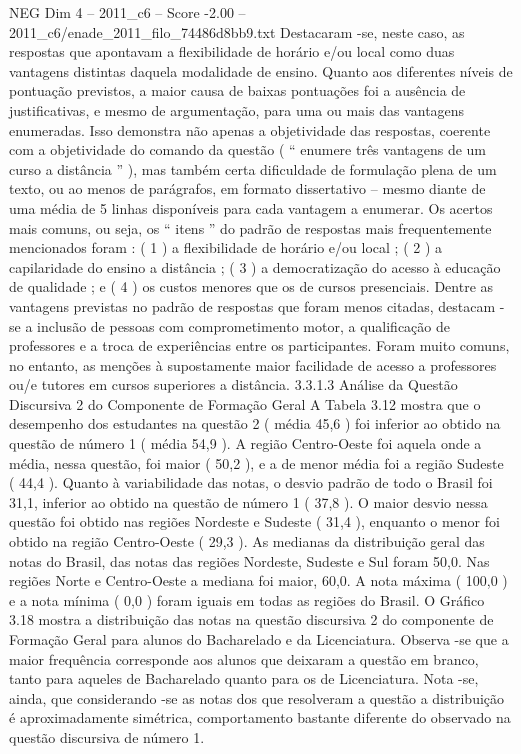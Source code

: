 \begin{textsample}{NEG Dim 4 – 2011\_c6 – Score -2.00 – 2011\_c6/enade\_2011\_filo\_74486d8bb9.txt}
Destacaram -se, neste caso, as respostas que apontavam a flexibilidade de horário e/ou local como duas vantagens distintas daquela modalidade de ensino.
Quanto aos diferentes níveis de pontuação previstos, a maior causa de baixas pontuações foi a ausência de justificativas, e mesmo de argumentação, para uma ou mais das vantagens enumeradas.
Isso demonstra não apenas a objetividade das respostas, coerente com a objetividade do comando da questão ( “ enumere três vantagens de um curso a distância ” ), mas também certa dificuldade de formulação plena de um texto, ou ao menos de parágrafos, em formato dissertativo – mesmo diante de uma média de 5 linhas disponíveis para cada vantagem a enumerar.
Os acertos mais comuns, ou seja, os “ itens ” do padrão de respostas mais frequentemente mencionados foram : ( 1 ) a flexibilidade de horário e/ou local ; ( 2 ) a capilaridade do ensino a distância ; ( 3 ) a democratização do acesso à educação de qualidade ; e ( 4 ) os custos menores que os de cursos presenciais.
Dentre as vantagens previstas no padrão de respostas que foram menos citadas, destacam -se a inclusão de pessoas com comprometimento motor, a qualificação de professores e a troca de experiências entre os participantes.
Foram muito comuns, no entanto, as menções à supostamente maior facilidade de acesso a professores ou/e tutores em cursos superiores a distância. 3.3.1.3 Análise da Questão Discursiva 2 do Componente de Formação Geral A Tabela 3.12 mostra que o desempenho dos estudantes na questão 2 ( média 45,6 ) foi inferior ao obtido na questão de número 1 ( média 54,9 ).
A região Centro-Oeste foi aquela onde a média, nessa questão, foi maior ( 50,2 ), e a de menor média foi a região Sudeste ( 44,4 ).
Quanto à variabilidade das notas, o desvio padrão de todo o Brasil foi 31,1, inferior ao obtido na questão de número 1 ( 37,8 ).
O maior desvio nessa questão foi obtido nas regiões Nordeste e Sudeste ( 31,4 ), enquanto o menor foi obtido na região Centro-Oeste ( 29,3 ).
As medianas da distribuição geral das notas do Brasil, das notas das regiões Nordeste, Sudeste e Sul foram 50,0.
Nas regiões Norte e Centro-Oeste a mediana foi maior, 60,0.
A nota máxima ( 100,0 ) e a nota mínima ( 0,0 ) foram iguais em todas as regiões do Brasil.
O Gráfico 3.18 mostra a distribuição das notas na questão discursiva 2 do componente de Formação Geral para alunos do Bacharelado e da Licenciatura.
Observa -se que a maior frequência corresponde aos alunos que deixaram a questão em branco, tanto para aqueles de Bacharelado quanto para os de Licenciatura.
Nota -se, ainda, que considerando -se as notas dos que resolveram a questão a distribuição é aproximadamente simétrica, comportamento bastante diferente do observado na questão discursiva de número 1.

\end{textsample}
